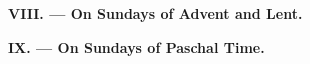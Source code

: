 {\label{benedicamusdomino-lent}\label{benedicamusdomino-advent}
{{\centering \bfseries VIII. — On Sundays of Advent and Lent.\\}
}
\bigskip

\label{benedicamusdomino-easter}
{{\centering \bfseries IX. — On Sundays of Paschal Time.\\}
}

}